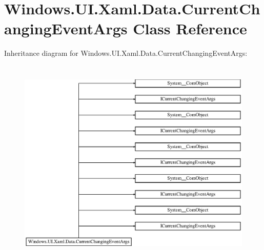 \hypertarget{class_windows_1_1_u_i_1_1_xaml_1_1_data_1_1_current_changing_event_args}{}\section{Windows.\+U\+I.\+Xaml.\+Data.\+Current\+Changing\+Event\+Args Class Reference}
\label{class_windows_1_1_u_i_1_1_xaml_1_1_data_1_1_current_changing_event_args}
Inheritance diagram for Windows.\+U\+I.\+Xaml.\+Data.\+Current\+Changing\+Event\+Args\+:\begin{figure}[H]
\begin{center}
\leavevmode
\includegraphics[height=10.032573cm]{class_windows_1_1_u_i_1_1_xaml_1_1_data_1_1_current_changing_event_args}
\end{center}
\end{figure}
